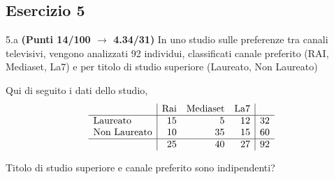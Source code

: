 \documentclass[
  11pt,
]{book}
\theoremstyle{mytheoremstyle}
\theoremstyle{mydefstyle}
\begin{document}
\subsection{Esercizio 5}\label{esercizio-5-4}

5.a \textbf{(Punti 14/100 \(\rightarrow\) 4.34/31)} In uno studio sulle preferenze tra canali televisivi, vengono analizzati 92
individui, classificati canale preferito (RAI, Mediaset, La7) e per titolo di studio superiore (Laureato, Non Laureato)

Qui di seguito i dati dello studio,
\[
\begin{array}{l|rrr|r}
 & \text{Rai} &\text{Mediaset} &\text{La7}& \\ \hline
 \text{Laureato}     &15 &5 &12  &32\\ 
 \text{Non Laureato} &10 &35  &15 &60\\ \hline
                     &25 &40  &27 &92 
\end{array}
\]

Titolo di studio superiore e canale preferito sono indipendenti?
\end{document}
